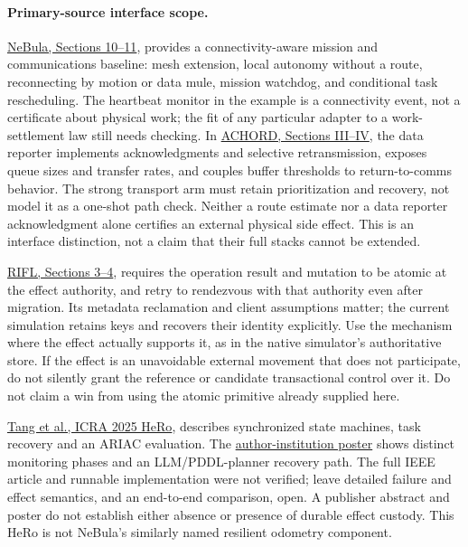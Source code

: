 \documentclass{article}
\begin{document}
\paragraph{Primary-source interface scope.}
\href{https://arxiv.org/html/2103.11470}{NeBula, Sections 10--11},
provides a connectivity-aware mission and communications baseline:
mesh extension, local autonomy without a route, reconnecting by motion
or data mule, mission watchdog, and conditional task rescheduling.
The heartbeat monitor in the example is a connectivity event, not a
certificate about physical work; the fit of any particular adapter to
a work-settlement law still needs checking. In
\href{https://arxiv.org/html/2206.02245}{ACHORD, Sections III--IV},
the data reporter implements acknowledgments and selective retransmission,
exposes queue sizes and transfer rates, and couples buffer thresholds to
return-to-comms behavior. The strong transport arm must retain
prioritization and recovery, not model it as a one-shot path check.
Neither a route estimate nor a data reporter acknowledgment alone
certifies an external physical side effect. This is an interface
distinction, not a claim that their full stacks cannot be extended.

\href{https://web.stanford.edu/~ouster/cgi-bin/papers/rifl.pdf}{RIFL, Sections 3--4},
requires the operation result and mutation to be atomic at the effect
authority, and retry to rendezvous with that authority even after
migration. Its metadata reclamation and client assumptions matter; the
current simulation retains keys and recovers their identity explicitly.
Use the mechanism where the effect actually supports it, as in the
native simulator's authoritative store. If the effect is an unavoidable
external movement that does not participate, do not silently grant
the reference or candidate transactional control over it. Do not claim
a win from using the atomic primitive already supplied here.

\href{https://ieeexplore.ieee.org/abstract/document/11128674}{Tang et al.,
ICRA 2025 HeRo}, describes synchronized state machines, task recovery
and an ARIAC evaluation. The
\href{https://is.cas.cn/ztzl/rjsxsnh/2025xsnh/205hbzs/202607/P020260715632339212745.pdf}{author-institution poster}
shows distinct monitoring phases and an LLM/PDDL-planner recovery path.
The full IEEE article and runnable implementation were not verified;
leave detailed failure and effect semantics, and an end-to-end
comparison, open. A publisher abstract and poster do not establish
either absence or presence of durable effect custody. This HeRo
is not NeBula's similarly named resilient odometry component.
\end{document}
